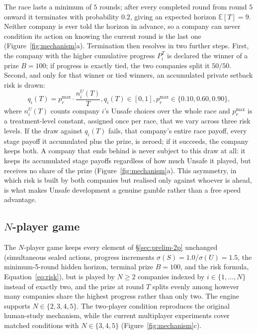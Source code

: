 \documentclass[sigconf]{aamas}
\begin{document}
The race lasts a minimum of $5$ rounds; after every completed round from round $5$ onward it terminates with probability $0.2$, giving an expected horizon $\mathbb{E}[T]=9$. Neither company is ever told the horizon in advance, so a company can never condition its action on knowing the current round is the last one (Figure~\ref{fig:mechanism}a). Termination then resolves in two further steps. First, the company with the higher cumulative progress $P_i^T$ is declared the winner of a prize $B=100$; if progress is exactly tied, the two companies split it $50/50$. Second, and only for that winner or tied winners, an accumulated private setback risk is drawn:
\begin{equation}
    q_i(T) = p_r^{\max} \cdot \frac{n_i^U(T)}{T}, q_i(T) \in [0,1], p_r^{\max}\in\{0.10,0.60,0.90\},
    \label{eq:risk}
\end{equation}
where $n_i^U(T)$ counts company $i$'s Unsafe choices over the whole race and $p_r^{\max}$ is a treatment-level constant, assigned once per race, that we vary across three risk levels. If the draw against $q_i(T)$ fails, that company's entire race payoff, every stage payoff it accumulated plus the prize, is zeroed; if it succeeds, the company keeps both. A company that ends behind is never subject to this draw at all: it keeps its accumulated stage payoffs regardless of how much Unsafe it played, but receives no share of the prize (Figure~\ref{fig:mechanism}a). This asymmetry, in which risk is built by both companies but realised only against whoever is ahead, is what makes Unsafe development a genuine gamble rather than a free speed advantage.

\subsection{$N$-player game}
\label{sec:prelim-np}

The $N$-player game keeps every element of \S\ref{sec:prelim-2p} unchanged (simultaneous sealed actions, progress increments $\sigma(S)=1.0$/$\sigma(U)=1.5$, the minimum-5-round hidden horizon, terminal prize $B=100$, and the risk formula, Equation~\ref{eq:risk}), but is played by $N\geq2$ companies indexed by $i\in\{1,\dots,N\}$ instead of exactly two, and the prize at round $T$ splits evenly among however many companies share the highest progress rather than only two. The engine supports \(N\in\{2,3,4,5\}\). The two-player condition
reproduces the original human-study mechanism, while the current
multiplayer experiments cover matched conditions with
\(N\in\{3,4,5\}\) (Figure~\ref{fig:mechanism}c).
\end{document}
